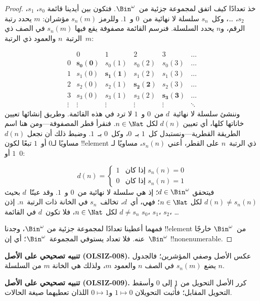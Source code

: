 \documentclass[../../../include/open-logic-section]{subfiles}
\begin{document}
\begin{proof}
خذ تعدادًا كيف اتفق لمجموعة جزئية من~$\Bin^\omega$. فتكون بين أيدينا قائمة $s_{0}$، $s_{1}$، $s_{2}$، \dots{}، وكل~$s_n$ سلسلة لا نهائية من~$0$ و~$1$. وللرمز $s_n(m)$ مؤشران: $m$ يحدد رتبة الرقم، و$n$ يحدد السلسلة. فنرسم القائمة مصفوفة يقع فيها $s_n(m)$ في الصف ذي الرتبة~$n$ والعمود ذي الرتبة~$m$:

\[
\begin{array}{c|c|c|c|c|c}
& 0 & 1 & 2 & 3 & \dots \\\hline
0 & \mathbf{s_{0}(0)} & s_{0}(1) & s_{0}(2) & s_0(3) & \dots \\\hline
1 & s_{1}(0)& \mathbf{s_{1}(1)} & s_1(2) & s_1(3) & \dots \\\hline
2 & s_{2}(0)& s_{2}(1) & \mathbf{s_2(2)} & s_2(3) & \dots \\\hline
3 & s_{3}(0)& s_{3}(1) & s_3(2) & \mathbf{s_3(3)} & \dots \\\hline
\vdots & \vdots & \vdots & \vdots & \vdots & \mathbf{\ddots}
\end{array}
\]
وننشئ سلسلة لا نهائية~$d$ من~$0$ و~$1$ لا ترد في هذه القائمة. وطريق إنشائها تعيين خاناتها كلها، أي تعيين $d(n)$ لكل $n \in
\Nat$. فنقرأ قطر المصفوفة---ومن هنا اسم الطريقة القطرية---ونستبدل كل~$1$ بـ~$0$، وكل~$0$ بـ~$1$. وضبط ذلك أن نجعل $d(n)$ مساويًا لـ$0$ أو~$1$ تبعًا لكون !!{element} ذي الرتبة~$n$ على القطر، أعني $s_n(n)$، مساويًا لـ$1$ أو~$0$:

\[
d(n) =
\begin{cases}
1 & \text{إذا كان $s_{n}(n) = 0$}\\
0 & \text{إذا كان $s_{n}(n) = 1$}
\end{cases}
\]
فيتحقق $d \in \Bin^\omega$؛ إذ هي سلسلة لا نهائية من~$0$ و~$1$. وقد عينّا~$d$ بحيث $d(n) \neq s_n(n)$ لكل $n \in
\Nat$؛ فهي، أي~$d$، تخالف~$s_n$ في الخانة ذات الرتبة~$n$. إذن $d \neq s_n$ لكل $n\in \Nat$، فلا تكون~$d$ في القائمة $s_0$، $s_1$، $s_2$، \dots

فمهما أعطينا تعدادًا لمجموعة جزئية من $\Bin^\omega$، وجدنا !!{element} من~$\Bin^\omega$ خارجًا عنه. فلا تعداد يستوفي المجموعة~$\Bin^\omega$؛ أي إن~$\Bin^\omega$ !!{nonenumerable}.
\end{proof}

\begin{editorial}
\textbf{تنبيه تصحيحي على الأصل (OLSIZ-008).}
عكس الأصل وصفي المؤشرين؛ فالجدول يضع $s_n(m)$ في الصف $n$
والعمود $m$، ولذلك هي الخانة $m$ من السلسلة $n$.

\textbf{تنبيه تصحيحي على الأصل (OLSIZ-009).}
كرر الأصل التحويل من $1$ إلى $0$ وأسقط التحويل المقابل؛
فأُثبت التحويلان $1\mapsto0$ و$0\mapsto1$ اللذان تعطيهما صيغة الحالات.
\end{editorial}
\end{document}
